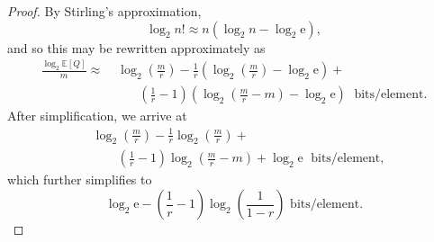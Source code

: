 \documentclass[hidelinks,11pt,final]{article}
\theoremstyle{plain}
\newcommand{\Expect}[1]{\mathbb{E}\left[#1\right]}
\begin{document}
\begin{proof}
By Stirling's approximation,
\begin{equation}
    \log_2 n! \approx n \left(\log_2 n - \log_2 \mathrm{e}\right),
\end{equation}
and so this may be rewritten approximately as
\begin{equation}
\begin{split}
    \frac{\log_2 \Expect{Q}}{m} \approx &\;
        \log_2\!\left(\frac{m}{r}\right) -
            \frac{1}{r} \left(\log_2\!\left(\frac{m}{r}\right) - \log_2 \mathrm{e}\right) +\\
        &\qquad\left(\frac{1}{r}-1\right) \left(\log_2\!\left(\frac{m}{r}-m\right) - \log_2 \mathrm{e} \right) \; \text{ bits/element}.
\end{split}
\end{equation}
After simplification, we arrive at
\begin{equation}
\begin{split}
    &\log_2\!\left(\frac{m}{r}\right) - \frac{1}{r} \log_2\!\left(\frac{m}{r}\right) +\\
    &\qquad \left(\frac{1}{r}-1\right) \log_2\!\left(\frac{m}{r}-m\right) + \log_2 \mathrm{e} \; \text{ bits/element},
\end{split}
\end{equation}
which further simplifies to
\begin{equation}
    \log_2 \mathrm{e} - \left(\frac{1}{r} - 1\right) \log_2\!\left(\frac{1}{1-r}\right) \text{ bits/element}.
\end{equation}
\end{proof}
\end{document}
